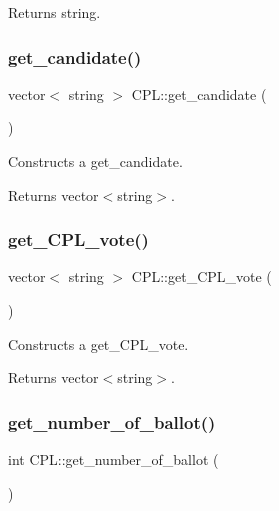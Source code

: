 \begin{DoxyReturn}{Returns}
string. 
\end{DoxyReturn}
\mbox{\label{classCPL_ac06cdb1d7cf39353e228c15da25a54a5}} 
\subsubsection{\texorpdfstring{get\+\_\+candidate()}{get\_candidate()}}
{\footnotesize\ttfamily vector$<$ string $>$ C\+P\+L\+::get\+\_\+candidate (\begin{DoxyParamCaption}{ }\end{DoxyParamCaption})}



Constructs a get\+\_\+candidate. 

\begin{DoxyReturn}{Returns}
vector$<$string$>$. 
\end{DoxyReturn}
\mbox{\label{classCPL_a3794df539bec96057658c15dad899b6b}} 
\subsubsection{\texorpdfstring{get\+\_\+\+C\+P\+L\+\_\+vote()}{get\_CPL\_vote()}}
{\footnotesize\ttfamily vector$<$ string $>$ C\+P\+L\+::get\+\_\+\+C\+P\+L\+\_\+vote (\begin{DoxyParamCaption}{ }\end{DoxyParamCaption})}



Constructs a get\+\_\+\+C\+P\+L\+\_\+vote. 

\begin{DoxyReturn}{Returns}
vector$<$string$>$. 
\end{DoxyReturn}
\mbox{\label{classCPL_a2425a880e70c142b80678215be6786e3}} 
\subsubsection{\texorpdfstring{get\+\_\+number\+\_\+of\+\_\+ballot()}{get\_number\_of\_ballot()}}
{\footnotesize\ttfamily int C\+P\+L\+::get\+\_\+number\+\_\+of\+\_\+ballot (\begin{DoxyParamCaption}{ }\end{DoxyParamCaption})}



